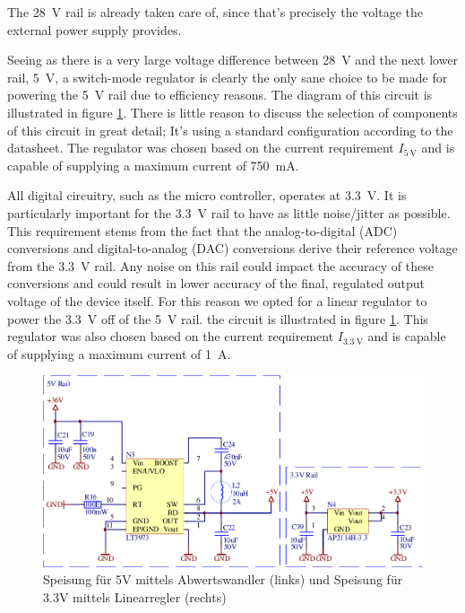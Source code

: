 The \SI{28}{\volt}  rail  is  already  taken care of, since that's precisely the
voltage the external power supply provides.

Seeing as  there  is  a very large voltage difference between \SI{28}{\volt} and
the next lower rail, \SI{5}{\volt}, a switch-mode regulator is clearly  the only
sane choice to be made for powering  the  \SI{5}{\volt}  rail  due to efficiency
reasons.   The    diagram   of   this   circuit   is   illustrated   in   figure
\ref{fig:circuit:rails}. There is little reason  to  discuss  the  selection  of
components of  this circuit in great detail; It's using a standard configuration
according  to  the  datasheet.  The  regulator  was  chosen based on the current
requirement $I_{\SI{5}{\volt}}$ and is capable of supplying a maximum current of
\SI{750}{\milli\ampere}.

All   digital   circuitry,  such  as   the   micro   controller,   operates   at
\SI{3.3}{\volt}. It is particularly important for the  \SI{3.3}{\volt}  rail  to
have as  little  noise/jitter  as possible. This requirement stems from the fact
that  the  analog-to-digital  (ADC)  conversions  and  digital-to-analog   (DAC)
conversions derive their  reference  voltage  from the \SI{3.3}{\volt} rail. Any
noise on  this  rail  could  impact  the accuracy of these conversions and could
result in lower accuracy of the final,  regulated  output  voltage of the device
itself.  For  this  reason  we  opted  for  a  linear  regulator  to  power  the
\SI{3.3}{\volt} off of the \SI{5}{\volt} rail.  the  circuit  is  illustrated in
figure  \ref{fig:circuit:rails}.  This regulator was also chosen  based  on  the
current requirement $I_{\SI{3.3}{\volt}}$ and is capable of  supplying a maximum
current of \SI{1}{\ampere}.

\begin{figure}[th!]
    \center
    \includegraphics[width=.75\textwidth]{images/circuit/5v-3v-rails.pdf}
    \caption{Speisung f\"ur 5V mittels Abwertswandler (links) und Speisung f\"ur 3.3V mittels Linearregler (rechts)}
    \label{fig:circuit:rails}
\end{figure}

